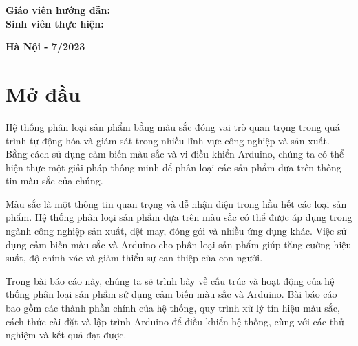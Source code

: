 \documentclass[12pt]{report}
\begin{document}
\begin{flushleft}
\hspace{1.5 cm} \fontsize{14pt}{1}\textbf{ Giáo viên hướng dẫn:\hspace{0.4cm}{GVHD}}\\[0.5cm]
\hspace{1.5 cm} \textbf{ Sinh viên thực hiện:
\hspace{0.4cm}{  Nhóm 13:\\[0.2cm]}
\hspace{7.3 cm}{  Ngô Xuân Phong    - 20200461\\[0.2cm]}
\hspace{7.3 cm}{ Lê Công Minh      - 20205372\\[0.2cm]}
\hspace{7.3 cm}{ Trần Trung Thành  - 20205431\\[0.2cm]}
\hspace{7.3 cm}{ Vũ Minh Hoá       - 20205314\\}}

\end{flushleft}

\begin{center}
\textbf{{\normalsize Hà Nội - 7/2023}}\\
\end{center}

\tableofcontents

\newpage
\chapter*{Mở đầu}

Hệ thống phân loại sản phẩm bằng màu sắc đóng vai trò quan trọng trong quá trình tự động hóa và giám sát trong nhiều lĩnh vực công nghiệp và sản xuất. Bằng cách sử dụng cảm biến màu sắc và vi điều khiển Arduino, chúng ta có thể hiện thực một giải pháp thông minh để phân loại các sản phẩm dựa trên thông tin màu sắc của chúng.

Màu sắc là một thông tin quan trọng và dễ nhận diện trong hầu hết các loại sản phẩm. Hệ thống phân loại sản phẩm dựa trên màu sắc có thể được áp dụng trong ngành công nghiệp sản xuất, dệt may, đóng gói và nhiều ứng dụng khác. Việc sử dụng cảm biến màu sắc và Arduino cho phân loại sản phẩm giúp tăng cường hiệu suất, độ chính xác và giảm thiểu sự can thiệp của con người.

Trong bài báo cáo này, chúng ta sẽ trình bày về cấu trúc và hoạt động của hệ thống phân loại sản phẩm sử dụng cảm biến màu sắc và Arduino. Bài báo cáo bao gồm các thành phần chính của hệ thống, quy trình xử lý tín hiệu màu sắc, cách thức cài đặt và lập trình Arduino để điều khiển hệ thống, cùng với các thử nghiệm và kết quả đạt được.
\end{document}
